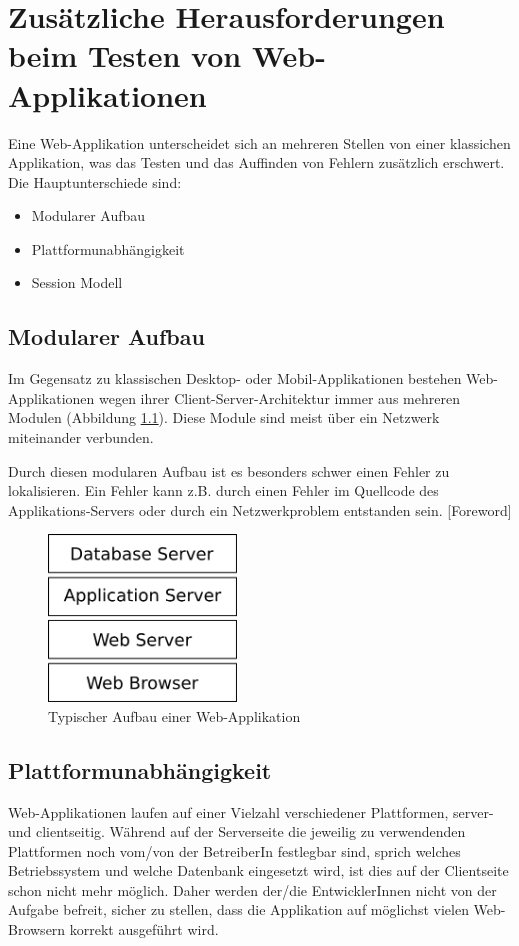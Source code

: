 \documentclass[a4paper,bibtotoc,oneside]{scrbook}
\begin{document}
\chapter{Zusätzliche Herausforderungen beim Testen von Web-Applikationen}
Eine Web-Applikation unterscheidet sich an mehreren Stellen von einer klassichen Applikation, was das Testen und das Auffinden von Fehlern zusätzlich erschwert. Die Hauptunterschiede sind:

\begin{itemize}
	\item Modularer Aufbau
	\item Plattformunabhängigkeit
	\item Session Modell
\end{itemize}


\section{Modularer Aufbau}

Im Gegensatz zu klassischen Desktop- oder Mobil-Applikationen bestehen Web-Applikationen wegen ihrer Client-Server-Architektur immer aus mehreren Modulen (Abbildung \ref{Abb4}). Diese Module sind meist über ein Netzwerk miteinander verbunden.

Durch diesen modularen Aufbau ist es besonders schwer einen Fehler zu lokalisieren. Ein Fehler kann z.B. durch einen Fehler im Quellcode des Applikations-Servers oder durch ein Netzwerkproblem entstanden sein. \cite{testing_apps_on_web}[Foreword]

\begin{figure}[h!]
\centering
\includegraphics[width=50mm]{img/webstack.png}
\caption[Typischer Aufbau einer Web-Applikation]{Typischer Aufbau einer Web-Applikation}\label{Abb4}
\end{figure}

\section{Plattformunabhängigkeit}
Web-Applikationen laufen auf einer Vielzahl verschiedener Plattformen, server- und clientseitig. Während auf der Serverseite die jeweilig zu verwendenden Plattformen noch vom/von der BetreiberIn festlegbar sind, sprich welches Betriebssystem und welche Datenbank eingesetzt wird, ist dies auf der Clientseite schon nicht mehr möglich. Daher werden der/die EntwicklerInnen nicht von der Aufgabe befreit, sicher zu stellen, dass die Applikation auf möglichst vielen Web-Browsern korrekt ausgeführt wird.
\end{document}
